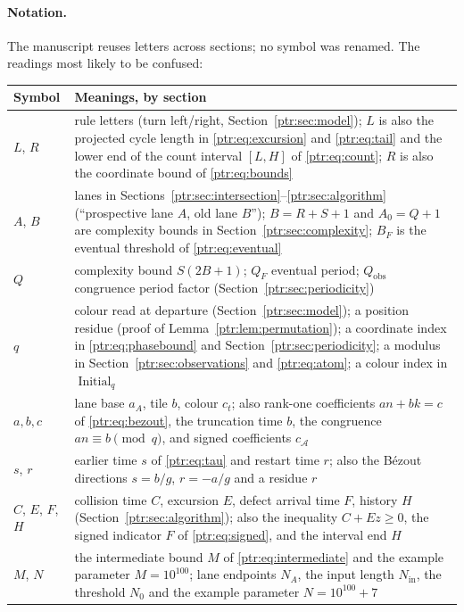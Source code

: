 \documentclass[11pt,letterpaper]{article}
\theoremstyle{definition}\newtheorem{definition}[theorem]{Definition}
\theoremstyle{remark}\newtheorem{remark}[theorem]{Remark}
\begin{document}
\paragraph{Notation.} The manuscript reuses letters across sections; no
symbol was renamed. The readings most likely to be confused:
\begin{center}\small
\begin{tabular}{@{}>{\raggedright\arraybackslash}p{}>{\raggedright\arraybackslash}p{}@{}}
\toprule
Symbol & Meanings, by section\\
\midrule
$L$, $R$ & rule letters (turn left/right, Section~\ref{ptr:sec:model});
$L$ is also the projected cycle length in \eqref{ptr:eq:excursion}
and \eqref{ptr:eq:tail} and the lower end of the count interval $[L,H]$
of \eqref{ptr:eq:count}; $R$ is also the coordinate bound of
\eqref{ptr:eq:bounds}\\
$A$, $B$ & lanes in Sections~\ref{ptr:sec:intersection}--\ref{ptr:sec:algorithm}
(``prospective lane $A$, old lane $B$''); $B=R+S+1$ and $A_0=Q+1$ are
complexity bounds in Section~\ref{ptr:sec:complexity}; $B_F$ is the eventual
threshold of \eqref{ptr:eq:eventual}\\
$Q$ & complexity bound $S(2B+1)$; $Q_F$ eventual period; $Q_{\mathrm{obs}}$
congruence period factor (Section~\ref{ptr:sec:periodicity})\\
$q$ & colour read at departure (Section~\ref{ptr:sec:model}); a position
residue (proof of Lemma~\ref{ptr:lem:permutation}); a coordinate index
in \eqref{ptr:eq:phasebound} and Section~\ref{ptr:sec:periodicity}; a
modulus in Section~\ref{ptr:sec:observations} and \eqref{ptr:eq:atom}; a colour index in
$\operatorname{Initial}_q$\\
$a,b,c$ & lane base $a_A$, tile $b$, colour $c_t$; also rank-one
coefficients $an+bk=c$ of \eqref{ptr:eq:bezout}, the truncation time $b$, the
congruence $an\equiv b\pmod q$, and signed coefficients $c_{\mathcal A}$\\
$s$, $r$ & earlier time $s$ of \eqref{ptr:eq:tau} and restart time $r$; also
the B\'ezout directions $s=b/g$, $r=-a/g$ and a residue $r$\\
$C$, $E$, $F$, $H$ & collision time $C$, excursion $E$, defect arrival
time $F$, history $H$ (Section~\ref{ptr:sec:algorithm}); also the
inequality $C+Ez\ge0$, the signed indicator $F$ of \eqref{ptr:eq:signed},
and the interval end $H$\\
$M$, $N$ & the intermediate bound $M$ of \eqref{ptr:eq:intermediate} and the
example parameter $M=10^{100}$; lane endpoints $N_A$, the input length
$N_{\mathrm{in}}$, the threshold $N_0$ and the example parameter
$N=10^{100}+7$\\
\bottomrule
\end{tabular}
\end{center}
\end{document}
